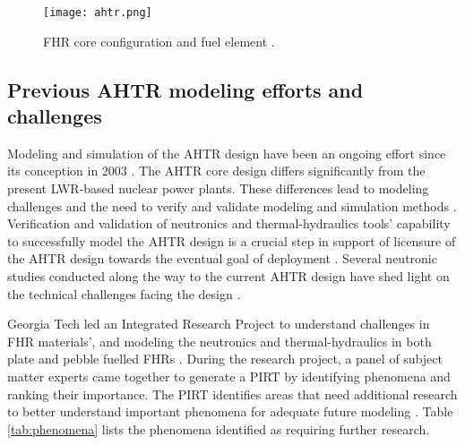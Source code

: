 \begin{figure}[H]
    \centering
    \texttt{[image: ahtr.png]} 
    \caption{FHR core configuration and fuel element \cite{ramey_monte_2018}.}
    \label{fig:ahtr}
\end{figure}

\subsection{Previous AHTR modeling efforts and challenges}
Modeling and simulation of the \gls{AHTR} design have been an ongoing effort 
since its conception in 2003 \cite{forsberg_molten-salt-cooled_2003}. 
The \gls{AHTR} core design differs significantly from the present \gls{LWR}-based 
nuclear power plants. 
These differences lead to modeling challenges and the need to verify and 
validate modeling and simulation methods \cite{ramey_monte_2018}. 
Verification and validation of neutronics and thermal-hydraulics tools' 
capability to successfully model the \gls{AHTR} design is a crucial step 
in support of licensure of the \gls{AHTR} design towards the eventual goal 
of deployment \cite{rahnema_phenomena_2019,rahnema_current_2015}. 
Several neutronic studies conducted along the way to the current \gls{AHTR} 
design have shed light on the technical challenges facing the design 
\cite{ramey_monte_2018,holcomb_fluoride_2013,greene_pre-conceptual_2010}. 


\gls{Georgia Tech} led an Integrated Research Project to 
understand challenges in \gls{FHR} materials', and modeling the neutronics and 
thermal-hydraulics in both plate and pebble fuelled \glspl{FHR} 
\cite{zhang_integrated_2019}. 
During the research project, a panel of subject matter experts came together to 
generate a \gls{PIRT} by identifying phenomena and ranking their importance.
The \gls{PIRT} identifies areas that need additional research to better 
understand important phenomena for adequate future modeling
\cite{rahnema_phenomena_2019}. 
Table \ref{tab:phenomena} lists the phenomena identified as requiring further 
research. 

